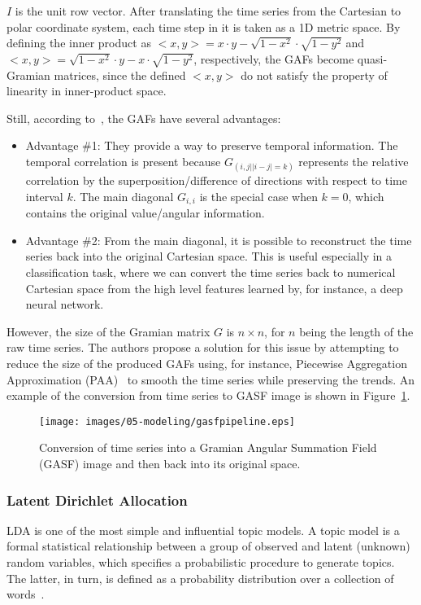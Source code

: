 $I$ is the unit row vector. After translating the time series from the Cartesian to polar coordinate system, each time step in it is taken as a 1D metric space. By defining the inner product as $<x,y> = x \cdot y - \sqrt{1-x^2} \cdot \sqrt{1-y^2}$ and $<x,y> = \sqrt{1-x^2} \cdot y - x \cdot \sqrt{1-y^2}$,
respectively, the GAFs become {quasi-Gramian} matrices, since the defined $<x,y>$ do not satisfy the property of linearity in inner-product space.

Still, according to~\cite{wang_imaging_2015}, the GAFs have several advantages:

\begin{itemize}[leftmargin=*,labelsep=5.8mm]
\item {Advantage \#1}: They provide a way to preserve temporal information. The temporal correlation is present because $G_{(i,j||i-j|=k)}$ represents the relative correlation by the superposition/difference of directions with respect to time interval $k$. The main diagonal $G_{i,i}$ is the special case when $k = 0$, which contains the original value/angular information. 
\item {Advantage \#2:} From the main diagonal, it is possible to reconstruct the time series back into the original Cartesian space. This is useful especially in a classification task, where we can convert the time series back to numerical Cartesian space from the high level features learned by, for instance, a deep neural network.
\end{itemize}

However, the size of the Gramian matrix $G$ is $n \times n$, for $n$ being the length of the raw time series. The authors propose a solution for this issue by attempting to reduce the size of the produced GAFs using, for instance, Piecewise Aggregation Approximation (PAA)~\cite{keogh_scaling_2000} to smooth the time series while preserving the trends. An example of the conversion from time series to GASF image is shown in Figure~\ref{figure:gasf_example}.

\begin{figure} [H]
\centering
\texttt{[image: images/05-modeling/gasfpipeline.eps]} 
 \caption{Conversion of time series into a Gramian Angular Summation Field (GASF) image and then back into its original space.}
 \label{figure:gasf_example}
\end{figure}

\subsubsection{Latent Dirichlet Allocation}
LDA is one of the most simple and influential topic models. {A topic model is a formal statistical relationship between a group of observed and latent (unknown) random variables, which specifies a probabilistic procedure to generate topics. The latter, in turn, is defined as a probability distribution over a collection of words}~\cite{reed_latent_2012}.

